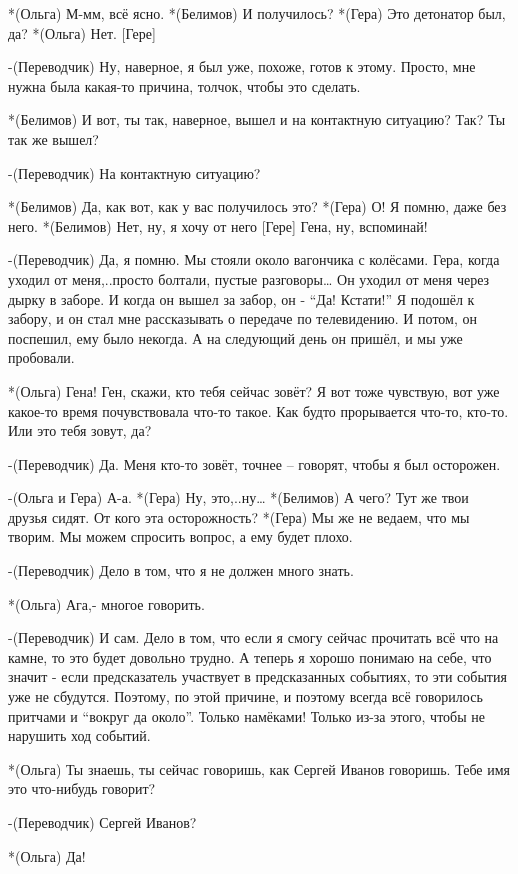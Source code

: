 *(Ольга) М-мм, всё ясно.
*(Белимов) И получилось?
*(Гера) Это детонатор был, да?
*(Ольга) Нет. [Гере]

-(Переводчик) Ну, наверное, я был уже, похоже, готов к этому. Просто, мне нужна была какая-то причина, толчок, чтобы это сделать.

*(Белимов) И вот, ты так, наверное, вышел и на контактную ситуацию? Так? Ты так же вышел?

-(Переводчик) На контактную ситуацию?

*(Белимов) Да, как вот, как у вас получилось это?
*(Гера) О! Я помню, даже без него.
*(Белимов) Нет, ну, я хочу от него [Гере] Гена, ну, вспоминай!

-(Переводчик) Да, я помню. Мы стояли около вагончика с колёсами. Гера, когда уходил от меня,..просто болтали, пустые разговоры… Он уходил от меня через дырку в заборе. И когда он вышел за забор, он  - “Да! Кстати!”  Я подошёл к забору, и он стал мне рассказывать о передаче по телевидению. И потом, он поспешил, ему было некогда. А на следующий день он пришёл, и мы уже пробовали.

*(Ольга) Гена! Ген, скажи, кто тебя сейчас зовёт? Я вот тоже чувствую, вот уже какое-то время почувствовала что-то такое. Как будто прорывается что-то, кто-то. Или это тебя зовут, да?

-(Переводчик) Да. Меня кто-то зовёт, точнее – говорят, чтобы я был осторожен.

-(Ольга и Гера) А-а.
*(Гера) Ну, это,..ну…
*(Белимов) А чего? Тут же твои друзья сидят. От кого эта осторожность?
*(Гера) Мы же не ведаем, что мы творим. Мы можем спросить вопрос, а ему будет плохо.

-(Переводчик) Дело в том, что я не должен много знать.

*(Ольга) Ага,-  многое говорить.

-(Переводчик) И сам. Дело в том, что если я смогу сейчас прочитать всё что на камне, то это будет довольно трудно. А теперь я хорошо понимаю на себе, что значит -  если предсказатель участвует в предсказанных событиях, то  эти события уже не сбудутся. Поэтому, по этой причине, и поэтому всегда всё говорилось притчами и “вокруг да около”. Только намёками! Только из-за этого, чтобы не нарушить ход событий. 

*(Ольга) Ты знаешь, ты сейчас говоришь, как Сергей Иванов говоришь. Тебе имя это что-нибудь говорит? 

-(Переводчик) Сергей Иванов?

*(Ольга) Да!

